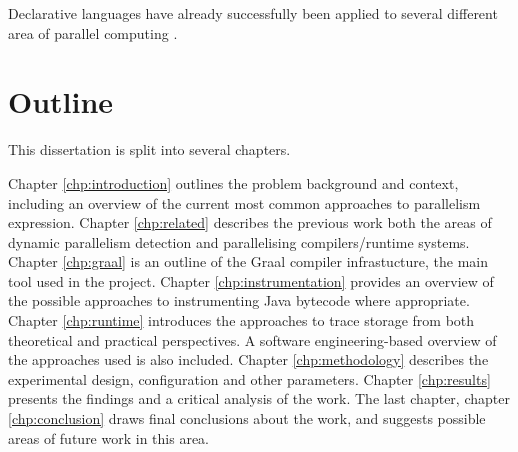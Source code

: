 Declarative languages have already successfully been applied to several different area of parallel computing \citep{Orchard2010,Grossman2011,Holk2011}.


\section{Outline} \label{sec:introduction/outline}
This dissertation is split into several chapters.

Chapter \ref{chp:introduction} outlines the problem background and context, including an overview of the current most common approaches to parallelism expression. Chapter \ref{chp:related} describes the previous work both the areas of dynamic parallelism detection and parallelising compilers/runtime systems. Chapter \ref{chp:graal} is an outline of the Graal compiler infrastucture, the main tool used in the project. Chapter \ref{chp:instrumentation} provides an overview of the possible approaches to instrumenting Java bytecode where appropriate. Chapter \ref{chp:runtime} introduces the approaches to trace storage from both theoretical and practical perspectives. A software engineering-based overview of the approaches used is also included. Chapter \ref{chp:methodology} describes the experimental design, configuration and other parameters. Chapter \ref{chp:results} presents the findings and a critical analysis of the work. The last chapter, chapter \ref{chp:conclusion} draws final conclusions about the work, and suggests possible areas of future work in this area.
